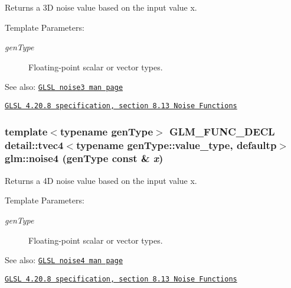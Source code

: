 Returns a 3D noise value based on the input value x.

\begin{Desc}
\item[Template Parameters:]
\begin{description}
\item[{\em genType}]Floating-point scalar or vector types.\end{description}
\end{Desc}
\begin{Desc}
\item[See also:]\href{http://www.opengl.org/sdk/docs/manglsl/xhtml/noise3.xml}{\tt GLSL noise3 man page} 

\href{http://www.opengl.org/registry/doc/GLSLangSpec.4.20.8.pdf}{\tt GLSL 4.20.8 specification, section 8.13 Noise Functions} \end{Desc}
\hypertarget{group__core__func__noise_g1b0e265d42fa1abacdf1980959d80f78}{
\subsubsection[noise4]{\setlength{\rightskip}{0pt plus 5cm}template$<$typename genType$>$ GLM\_\-FUNC\_\-DECL detail::tvec4$<$typename genType::value\_\-type, defaultp$>$ glm::noise4 (genType const \& {\em x})}}
\label{group__core__func__noise_g1b0e265d42fa1abacdf1980959d80f78}


Returns a 4D noise value based on the input value x.

\begin{Desc}
\item[Template Parameters:]
\begin{description}
\item[{\em genType}]Floating-point scalar or vector types.\end{description}
\end{Desc}
\begin{Desc}
\item[See also:]\href{http://www.opengl.org/sdk/docs/manglsl/xhtml/noise4.xml}{\tt GLSL noise4 man page} 

\href{http://www.opengl.org/registry/doc/GLSLangSpec.4.20.8.pdf}{\tt GLSL 4.20.8 specification, section 8.13 Noise Functions} \end{Desc}
